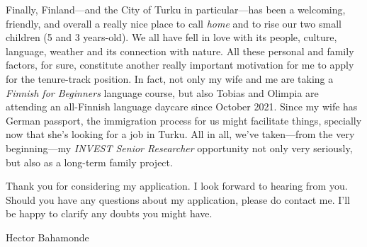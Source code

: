 \documentclass[10pt,stdletter,dateno,sigleft]{newlfm} %
\begin{document}
\begin{newlfm}



Finally, Finland---and the City of Turku in particular---has been a welcoming, friendly, and overall a really nice place to call \emph{home} and to rise our two small children (5 and 3 years-old). We all have fell in love with its people, culture, language, weather and its connection with nature. All these personal and family factors, for sure, constitute another really important motivation for me to apply for the tenure-track position. In fact, not only my wife and me are taking a \emph{Finnish for Beginners} language course, but also Tobias and Olimpia are attending an all-Finnish language daycare since October 2021. Since my wife has German passport, the immigration process for us might facilitate things, specially now that she's looking for a job in Turku. All in all, we've taken---from the very beginning---my \emph{INVEST Senior Researcher} opportunity not only very seriously, but also as a long-term family project. 

Thank you for considering my application. I look forward to hearing from you. Should you have any questions about my application, please do contact me. I'll be happy to clarify any doubts you might have.




\vspace{3cm}

{\hspace{12cm}Hector Bahamonde}


\newpage

\printbibliography




\end{newlfm}
\end{document}
